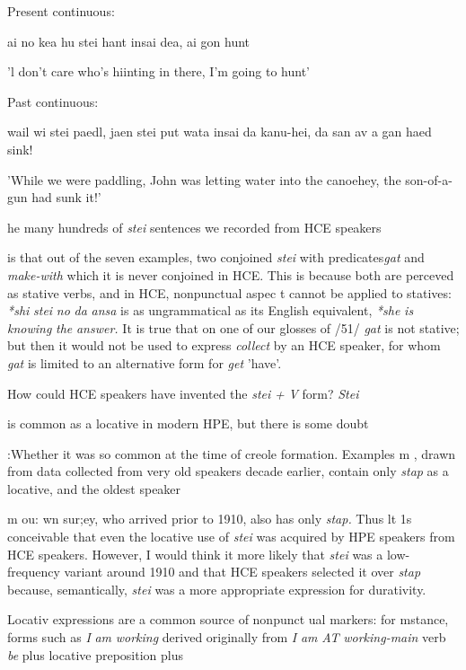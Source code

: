 \ea\label{ex:52}
 Present continuous:
\glt
\z

ai no kea hu stei hant insai dea, ai gon hunt

'l don't care who's hiinting in there, I'm going to hunt'

\ea\label{ex:53}
 Past continuous:
\glt
\z

wail wi stei paedl, jaen stei put wata insai da kanu-hei, da san av a gan haed sink!

'While we were paddling, John was letting water into the canoe\-hey, the son-of-a-gun had sunk it!'

he many hundreds of \textit{stei} sentences we recorded from HCE speakers

is that out of the seven examples, two conjoined \textit{stei} with predicates\-\textit{gat} and \textit{make-with} which it is never conjoined in HCE. This is because both are perceved as stative verbs, and in HCE, nonpunctual aspec t cannot be applied to statives: \textit{*shi} \textit{stei} \textit{no} \textit{da} \textit{ansa} is as ungrammatical as its English equivalent, \textit{*she} \textit{is} \textit{knowing} \textit{the} \textit{answer.} It is true that on one of our glosses of /51/ \textit{gat} is not stative; but then it would not be used to express \textit{collect }by an HCE speaker, for whom \textit{gat }is limited to an alternative form for \textit{get }'have'.

How could HCE speakers have invented the \textit{stei} \textit{+} \textit{V} form? \textit{Stei}

is common as a locative in modern HPE, but there is some doubt

:Whether it was so common at the time of creole formation. Examples m \citet{Nagara1972}, drawn from data collected from very old speakers decade earlier, contain only \textit{stap} as a locative, and the oldest speaker

m ou: wn sur;ey, who arrived prior to 1910, also has only \textit{stap.} Thus lt 1s conceivable that even the locative use of \textit{stei} was acquired by HPE speakers from HCE speakers. However, I would think it more likely that \textit{stei} was a low-frequency variant around 1910 and that HCE speakers selected it over \textit{stap} because, semantically, \textit{stei} was a more appropriate expression for durativity.

Locativ expressions are a common source of nonpunct ual markers: for mstance, forms such as \textit{I} \textit{am} \textit{worki}\textit{n}\textit{g} derived originally from \textit{I} \textit{am} \textit{AT} \textit{working-main} verb \textit{be} plus locative preposition plus

